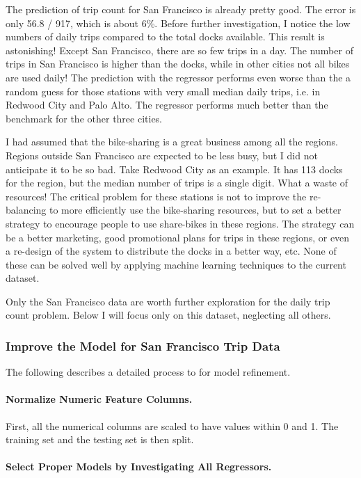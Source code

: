 \documentclass[a4paper]{article}
\begin{document}
			The prediction of trip count for San Francisco is already pretty good. The error is only 56.8 / 917, which is about 6\%. Before further investigation, I notice the low numbers of daily trips compared to the total docks available. This result is astonishing! Except San Francisco, there are so few trips in a day. The number of trips in San Francisco is higher than the docks, while in other cities not all bikes are used daily! The prediction with the regressor performs even worse than the a random guess for those stations with very small median daily trips, i.e. in Redwood City and Palo Alto. The regressor performs much better than the benchmark for the other three cities.
			
			I had assumed that the bike-sharing is a great business among all the regions. Regions outside San Francisco are expected to be less busy, but I did not anticipate it to be so bad. Take Redwood City as an example. It has 113 docks for the region, but the median number of trips is a single digit. What a waste of resources! The critical problem for these stations is not to improve the re-balancing to more efficiently use the bike-sharing resources, but to set a better strategy to encourage people to use share-bikes in these regions. The strategy can be a better marketing, good promotional plans for trips in these regions, or even a re-design of the system to distribute the docks in a better way, etc. None of these can be solved well by applying machine learning techniques to the current dataset.
			
			Only the San Francisco data are worth further exploration for the daily trip count problem. Below I will focus only on this dataset, neglecting all others. 

			\subsubsection{Improve the Model for San Francisco Trip Data}
			The following describes a detailed process to for model refinement.
			
				\paragraph{Normalize Numeric Feature Columns.}
				First, all the numerical columns are scaled to have values within 0 and 1. The training set and the testing set is then split.				
				
				\paragraph{Select Proper Models by Investigating All Regressors.}
				
\end{document}
